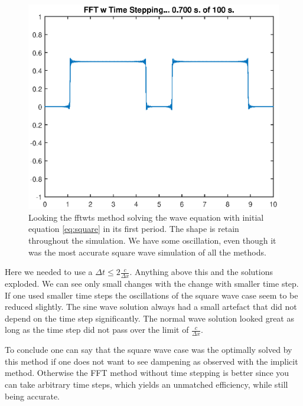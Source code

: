 \documentclass[11pt]{article}
\begin{document}
\begin{figure}[H]
	\centering
	\includegraphics[width=1\textwidth]{../fftwtsSquare}
	\caption{Looking the fftwts method solving the wave equation with initial equation 
	\ref{eq:square} in its first period. The shape is retain throughout the simulation. We have some oscillation, even though it was the most accurate square wave simulation of all the methods.}
	\label{fig:fftwtsSquare}
\end{figure}

Here we needed to use a $\Delta t \leq 2 \frac{c}{\Delta x}$. Anything above this and the solutions exploded. We can see only small changes with the change with smaller time step. If one used smaller time steps the oscillations of the square wave case seem to be reduced slightly. The sine wave solution always had a small artefact that did not depend on the time step significantly. The normal wave solution looked great as long as the time step did not pass over the limit of $\frac{c}{\Delta x}$.

To conclude one can say that the square wave case was the optimally solved by this method if one does not want to see dampening as observed with the implicit method. Otherwise the FFT method without time stepping is better since you can take arbitrary time steps, which yields an unmatched efficiency, while still being accurate. 
\end{document}
